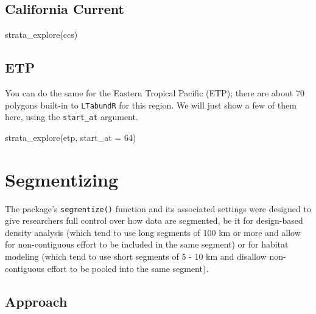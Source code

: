 \documentclass[
]{book}
\newenvironment{Shaded}{\begin{snugshade}}{\end{snugshade}}
\newcommand{\AttributeTok}[1]{\textcolor[rgb]{0.77,0.63,0.00}{#1}}
\newcommand{\DecValTok}[1]{\textcolor[rgb]{0.00,0.00,0.81}{#1}}
\newcommand{\FunctionTok}[1]{\textcolor[rgb]{0.00,0.00,0.00}{#1}}
\newcommand{\NormalTok}[1]{#1}
\newcommand{\StringTok}[1]{\textcolor[rgb]{0.31,0.60,0.02}{#1}}
\begin{document}
\hypertarget{california-current}{%
\section*{California Current}\label{california-current}}

\begin{Shaded}
\begin{Highlighting}[]
\FunctionTok{strata\_explore}\NormalTok{(}\StringTok{\textquotesingle{}ccs\textquotesingle{}}\NormalTok{)}
\end{Highlighting}
\end{Shaded}

\hypertarget{etp}{%
\section*{ETP}\label{etp}}

You can do the same for the Eastern Tropical Pacific (ETP); there are about 70 polygons built-in to \texttt{LTabundR} for this region. We will just show a few of them here, using the \texttt{start\_at} argument.

\begin{Shaded}
\begin{Highlighting}[]
\FunctionTok{strata\_explore}\NormalTok{(}\StringTok{\textquotesingle{}etp\textquotesingle{}}\NormalTok{,}
               \AttributeTok{start\_at =} \DecValTok{64}\NormalTok{)}
\end{Highlighting}
\end{Shaded}

\hypertarget{segmentizing}{%
\chapter{Segmentizing}\label{segmentizing}}

The package's \texttt{segmentize()} function and its associated settings were designed to give researchers full control over how data are segmented, be it for design-based density analysis (which tend to use long segments of 100 km or more and allow for non-contiguous effort to be included in the same segment) or for habitat modeling (which tend to use short segments of 5 - 10 km and disallow non-contiguous effort to be pooled into the same segment).

\hypertarget{approach}{%
\section*{Approach}\label{approach}}
\end{document}
